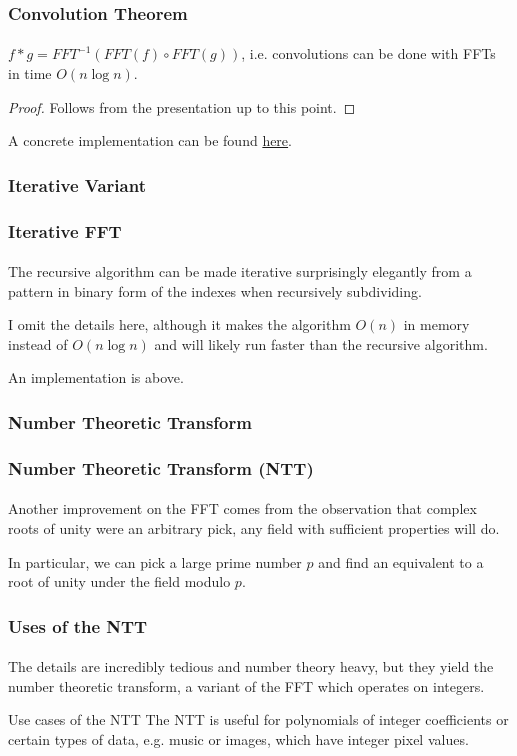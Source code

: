 \documentclass[11pt,handout]{beamer}             %
\begin{document}
\begin{frame}
\frametitle{Convolution Theorem}
\framesubtitle{}
\begin{theorem}
  \( f * g = FFT^{-1}(FFT(f) \circ FFT(g)) \), i.e. convolutions 
  can be done with FFTs in time \( O(n \log n) \).
\end{theorem}
\begin{proof}
Follows from the presentation up to this point.
\end{proof}

A concrete implementation can be found 
\href{https://gist.github.com/stephen-huan/aa609965c86d750736398c28b025f9be\#fast-fourier-transform}{here}.
\end{frame}

\subsubsection[Iterative]{Iterative Variant}
\begin{frame}
\frametitle{Iterative FFT}
\framesubtitle{}
The recursive algorithm can be made iterative surprisingly elegantly from a
pattern in binary form of the indexes when recursively subdividing. \pause

I omit the details here, although it makes the algorithm \( O(n) \) in memory
instead of \( O(n \log n) \) and will likely
run faster than the recursive algorithm. \pause

An implementation is above.
\end{frame}

\subsubsection[NTT]{Number Theoretic Transform}
\begin{frame}
\frametitle{Number Theoretic Transform (NTT)}
\framesubtitle{}
Another improvement on the FFT comes from the observation that complex
roots of unity were an arbitrary pick, any \alert{field} with sufficient
properties will do. \pause 

In particular, we can pick a large prime number \( p \) 
and find an equivalent to a root of unity under the field modulo \( p \).
\end{frame}

\begin{frame}
\frametitle{Uses of the NTT}
\framesubtitle{}
The details are incredibly tedious and number theory heavy, but they yield
the \alert{number theoretic transform}, a variant of the FFT which operates
on integers.
\begin{exampleblock}{Use cases of the NTT}
    The NTT is useful for polynomials of integer coefficients or certain types
    of data, e.g. music or images, which have integer pixel values.
\end{exampleblock}
\end{frame}
\end{document}
